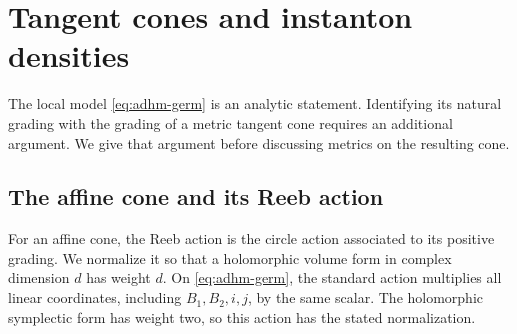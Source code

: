 \section{Tangent cones and instanton densities}\label{sec:cones}

The local model \eqref{eq:adhm-germ} is an analytic statement. Identifying
its natural grading with the grading of a metric tangent cone requires
an additional argument. We give that argument before discussing metrics
on the resulting cone.

\subsection{The affine cone and its Reeb action}
For an affine cone, the Reeb action is the circle action associated to
its positive grading. We normalize it so that a holomorphic volume form
in complex dimension $d$ has weight $d$.
On \eqref{eq:adhm-germ}, the standard action multiplies all linear
coordinates, including $B_1,B_2,i,j$, by the same scalar. The holomorphic
symplectic form has weight two, so this action has the stated normalization.

